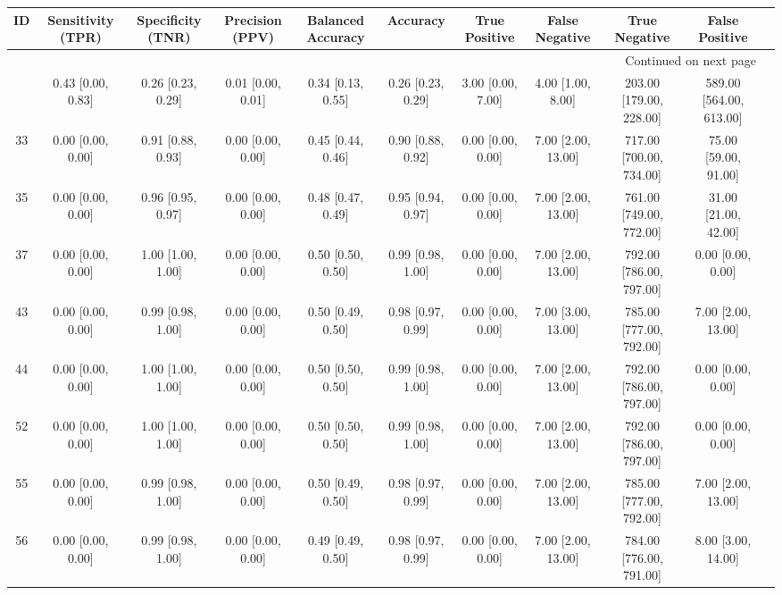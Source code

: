 \documentclass[8pt]{article}
\begin{document}
\begin{center}
\begin{footnotesize}
\begin{longtable}{|ccccccccccc|}
\toprule
 ID &  Sensitivity (TPR) &  Specificity (TNR) &    Precision (PPV) &  Balanced Accuracy &           Accuracy &      True Positive &      False Negative &            True Negative &           False Positive \\
\midrule
\endhead
\midrule
\multicolumn{10}{r}{{Continued on next page}} \\
\midrule
\endfoot

\bottomrule
\endlastfoot
 38 &  0.43 [0.00, 0.83] &  0.26 [0.23, 0.29] &  0.01 [0.00, 0.01] &  0.34 [0.13, 0.55] &  0.26 [0.23, 0.29] &  3.00 [0.00, 7.00] &   4.00 [1.00, 8.00] &  203.00 [179.00, 228.00] &  589.00 [564.00, 613.00] \\
 33 &  0.00 [0.00, 0.00] &  0.91 [0.88, 0.93] &  0.00 [0.00, 0.00] &  0.45 [0.44, 0.46] &  0.90 [0.88, 0.92] &  0.00 [0.00, 0.00] &  7.00 [2.00, 13.00] &  717.00 [700.00, 734.00] &     75.00 [59.00, 91.00] \\
 35 &  0.00 [0.00, 0.00] &  0.96 [0.95, 0.97] &  0.00 [0.00, 0.00] &  0.48 [0.47, 0.49] &  0.95 [0.94, 0.97] &  0.00 [0.00, 0.00] &  7.00 [2.00, 13.00] &  761.00 [749.00, 772.00] &     31.00 [21.00, 42.00] \\
 37 &  0.00 [0.00, 0.00] &  1.00 [1.00, 1.00] &  0.00 [0.00, 0.00] &  0.50 [0.50, 0.50] &  0.99 [0.98, 1.00] &  0.00 [0.00, 0.00] &  7.00 [2.00, 13.00] &  792.00 [786.00, 797.00] &        0.00 [0.00, 0.00] \\
 43 &  0.00 [0.00, 0.00] &  0.99 [0.98, 1.00] &  0.00 [0.00, 0.00] &  0.50 [0.49, 0.50] &  0.98 [0.97, 0.99] &  0.00 [0.00, 0.00] &  7.00 [3.00, 13.00] &  785.00 [777.00, 792.00] &       7.00 [2.00, 13.00] \\
 44 &  0.00 [0.00, 0.00] &  1.00 [1.00, 1.00] &  0.00 [0.00, 0.00] &  0.50 [0.50, 0.50] &  0.99 [0.98, 1.00] &  0.00 [0.00, 0.00] &  7.00 [2.00, 13.00] &  792.00 [786.00, 797.00] &        0.00 [0.00, 0.00] \\
 52 &  0.00 [0.00, 0.00] &  1.00 [1.00, 1.00] &  0.00 [0.00, 0.00] &  0.50 [0.50, 0.50] &  0.99 [0.98, 1.00] &  0.00 [0.00, 0.00] &  7.00 [2.00, 13.00] &  792.00 [786.00, 797.00] &        0.00 [0.00, 0.00] \\
 55 &  0.00 [0.00, 0.00] &  0.99 [0.98, 1.00] &  0.00 [0.00, 0.00] &  0.50 [0.49, 0.50] &  0.98 [0.97, 0.99] &  0.00 [0.00, 0.00] &  7.00 [2.00, 13.00] &  785.00 [777.00, 792.00] &       7.00 [2.00, 13.00] \\
 56 &  0.00 [0.00, 0.00] &  0.99 [0.98, 1.00] &  0.00 [0.00, 0.00] &  0.49 [0.49, 0.50] &  0.98 [0.97, 0.99] &  0.00 [0.00, 0.00] &  7.00 [2.00, 13.00] &  784.00 [776.00, 791.00] &       8.00 [3.00, 14.00] \\
\end{longtable}
\end{footnotesize}
\end{center}
\end{document}
